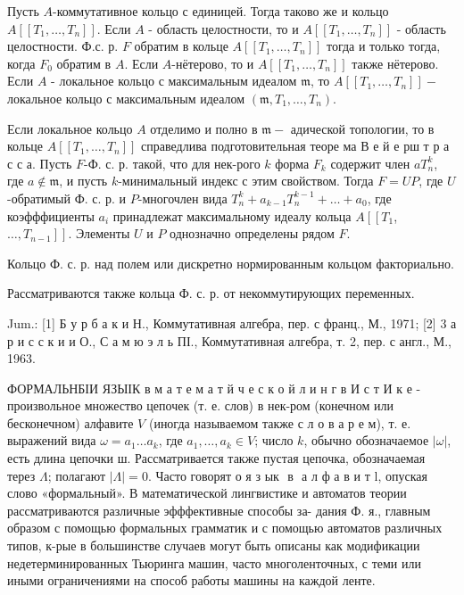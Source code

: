 \documentclass[10pt]{article}
\begin{document}
Пусть $A$-коммутативное кольцо с единицей. Тогда таково же и кольцо $A\left[\left[T_{1}, \ldots, T_{n}\right]\right]$. Если $A$ - область целостности, то и $A\left[\left[T_{1}, \ldots, T_{n}\right]\right]$ - область целостности. Ф.с. р. $F$ обратим в кольце $A\left[\left[T_{1}, \ldots, T_{n}\right]\right]$ тогда и только тогда, когда $F_{0}$ обратим в $A$. Если $A$-нётерово, то и $A\left[\left[T_{1}, \ldots, T_{n}\right]\right]$ также нётерово. Если $A$ - локальное кольцо с максимальным идеалом $\mathfrak{m}$, то $A\left[\left[T_{1}, \ldots, T_{n}\right]\right]-$ локальное кольцо с максимальным идеалом $\left(\mathfrak{m}, T_{1}, \ldots, T_{n}\right)$.



Если локальное кольцо $A$ отделимо и полно в $\mathfrak{m}-$ адической топологии, то в кольце $A\left[\left[T_{1}, \ldots, T_{n}\right]\right]$ справедлива подготовительная теоре ма В е й е рш т р а с с а. Пусть $F$-Ф. с. р. такой, что для нек-рого $k$ форма $F_{k}$ содержит член $a T_{n}^{k}$, где $a \notin \mathfrak{m}$, и пусть $k$-минимальный индекс с этим свойством. Тогда $F=U P$, где $U$-обратимый Ф. с. р. и $P$-многочлен вида $T_{n}^{k}+a_{k-1} T_{n}^{k-1}+\ldots+a_{0}$, где коэфффициенты $a_{i}$ принадлежат максимальному идеалу кольца $A\left[\left[T_{1}\right.\right.$, $\left.\left.\ldots, T_{n-1}\right]\right]$. Элементы $U$ и $P$ однозначно определены рядом $F$.



Кольцо Ф. с. р. над полем или дискретно нормированным кольцом факториально.



Рассматриваются также кольца Ф. с. р. от некоммутирующих переменных.



Jum.: [1] Б у р б а к и Н., Коммутативная алгебра, пер. с франц., М., 1971; [2] 3 а р и с с к и и О., С а м ю э л ь ПІ., Коммутативная алгебра, т. 2, пер. с англ., М., 1963.



ФОРМАЛЬНБІИ ЯЗЫІК в м а т е м а т й ч е с к о й л и н г в И с т И к е - произвольное множество цепочек (т. е. слов) в нек-ром (конечном или бесконечном) алфавите $V$ (иногда называемом также с л о в а р е м), т. е. выражений вида $\omega=a_{1} \ldots a_{k}$, где $a_{1}, \ldots, a_{k} \in V$; число $k$, обычно обозначаемое $|\omega|$, есть длина цепочки ш. Рассматривается также пустая цепочка, обозначаемая терез $\Lambda$; полагают $|\Lambda|=0$. Часто говорят о я з ык $\mathbf{\text { в }}$ а л ф а в и т $\mathrm{l}$, опуская слово «формальный». В математической лингвистике и автоматов теории рассматриваются различные эфффективные способы за- дания Ф. я., главным образом с помощью формальных грамматик и с помощью автоматов различных типов, к-рые в большинстве случаев могут быть описаны как модификации недетерминированных Тьюринга машин, часто многоленточных, с теми или иными ограничениями на способ работы машины на каждой ленте.
\end{document}
